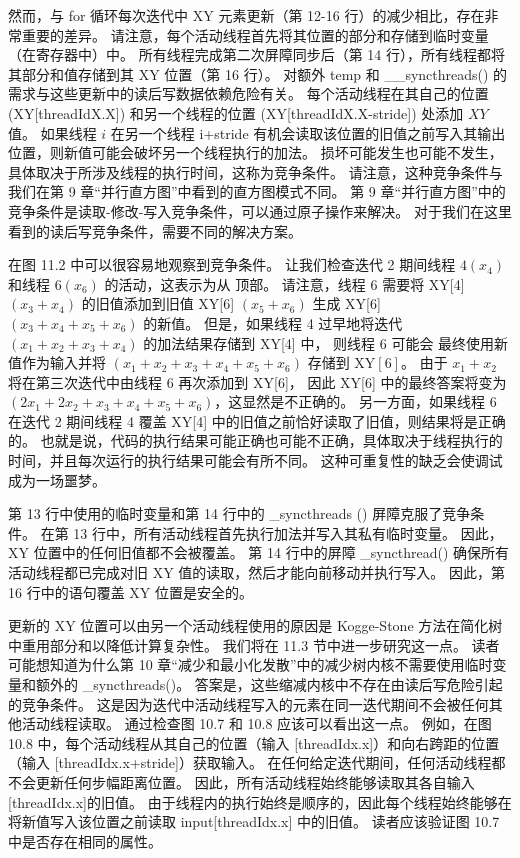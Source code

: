 然而，与 for 循环每次迭代中 XY 元素更新（第 12-16 行）的减少相比，存在非常重要的差异。 
请注意，每个活动线程首先将其位置的部分和存储到临时变量（在寄存器中）中。 
所有线程完成第二次屏障同步后（第 14 行），所有线程都将其部分和值存储到其 $\mathrm{XY}$ 位置（第 16 行）。 
对额外 temp 和 \_\_syncthreads() 的需求与这些更新中的读后写数据依赖危险有关。 
每个活动线程在其自己的位置 (XY[threadIdX.X]) 和另一个线程的位置 (XY[threadIdX.X-stride]) 处添加 $X Y$ 值。 
如果线程 $i$ 在另一个线程 i+stride 有机会读取该位置的旧值之前写入其输出位置，则新值可能会破坏另一个线程执行的加法。 
损坏可能发生也可能不发生，具体取决于所涉及线程的执行时间，这称为竞争条件。 
请注意，这种竞争条件与我们在第 9 章“并行直方图”中看到的直方图模式不同。 
第 9 章“并行直方图”中的竞争条件是读取-修改-写入竞争条件，可以通过原子操作来解决。 
对于我们在这里看到的读后写竞争条件，需要不同的解决方案。

在图 11.2 中可以很容易地观察到竞争条件。 
让我们检查迭代 2 期间线程 $4\left(x_{4}\right)$ 和线程 $6\left(x_{6}\right)$ 的活动，这表示为从 顶部。 
请注意，线程 6 需要将 XY[4] $\left(x_{3}+x_{4}\right)$ 的旧值添加到旧值 XY[6] $\left(x_{5}+x_ {6}\right)$ 生成 XY[6] $\left(x_{3}+x_{4}+x_{5}+x_{6}\right)$ 的新值。 
但是，如果线程 4 过早地将迭代 $\left(x_{1}+x_{2}+x_{3}+x_{4}\right)$ 的加法结果存储到 XY[4] 中，
则线程 6 可能会 最终使用新值作为输入并将 $\left(x_{1}+x_{2}+x_{3}+x_{4}+x_{5}+x_{6}\right)$ 存储到 $ \mathrm{XY}[6]$。 
由于 $x_{1}+x_{2}$ 将在第三次迭代中由线程 6 再次添加到 XY[6]，
因此 XY[6] 中的最终答案将变为 $\left(2 x_{1}+2 x_{2}+x_{3}+x_{4}+x_{5}+x_{6}\right)$，这显然是不正确的。 
另一方面，如果线程 6 在迭代 2 期间线程 4 覆盖 XY[4] 中的旧值之前恰好读取了旧值，则结果将是正确的。 
也就是说，代码的执行结果可能正确也可能不正确，具体取决于线程执行的时间，并且每次运行的执行结果可能会有所不同。 
这种可重复性的缺乏会使调试成为一场噩梦。

第 13 行中使用的临时变量和第 14 行中的 \_syncthreads () 屏障克服了竞争条件。
在第 13 行中，所有活动线程首先执行加法并写入其私有临时变量。 因此，XY 位置中的任何旧值都不会被覆盖。 
第 14 行中的屏障 \_syncthread() 确保所有活动线程都已完成对旧 XY 值的读取，然后才能向前移动并执行写入。 
因此，第 16 行中的语句覆盖 XY 位置是安全的。

更新的 XY 位置可以由另一个活动线程使用的原因是 Kogge-Stone 方法在简化树中重用部分和以降低计算复杂性。 
我们将在 11.3 节中进一步研究这一点。 
读者可能想知道为什么第 10 章“减少和最小化发散”中的减少树内核不需要使用临时变量和额外的 \_syncthreads()。 
答案是，这些缩减内核中不存在由读后写危险引起的竞争条件。 
这是因为迭代中活动线程写入的元素在同一迭代期间不会被任何其他活动线程读取。 
通过检查图 10.7 和 10.8 应该可以看出这一点。 
例如，在图 10.8 中，每个活动线程从其自己的位置（输入 [threadIdx.x]）和向右跨距的位置（输入 [threadIdx.x+stride]）获取输入。 在任何给定迭代期间，任何活动线程都不会更新任何步幅距离位置。 
因此，所有活动线程始终能够读取其各自输入[threadIdx.x]的旧值。 
由于线程内的执行始终是顺序的，因此每个线程始终能够在将新值写入该位置之前读取 input[threadIdx.x] 中的旧值。 
读者应该验证图 10.7 中是否存在相同的属性。

